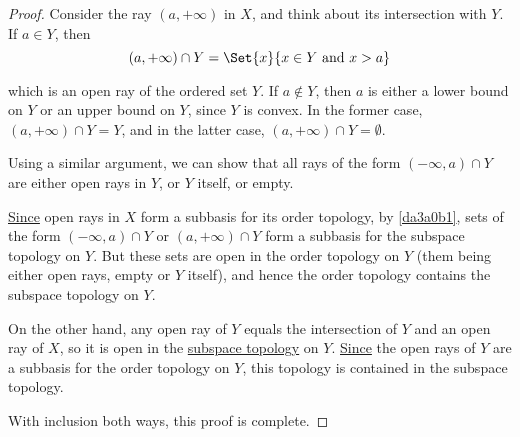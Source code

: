 \begin{proof}
  \def\T{\mathcal T}
  Consider the ray $(a,+\infty)$ in $X$, and think about its intersection with
  $Y$. If $a\in Y$, then
  $$
    (a,+\infty)\cap Y=\Set{x}{x\in Y\text{ and }x>a}
  $$

  which is an open ray of the ordered set $Y$. If $a\notin Y$, then $a$ is
  either a lower bound on $Y$ or an upper bound on $Y$, since $Y$ is convex. In
  the former case, $(a,+\infty)\cap Y=Y$, and in the latter case,
  $(a,+\infty)\cap Y=\emptyset$.

  Using a similar argument, we can show that all rays of the form
  $(-\infty,a)\cap Y$ are either open rays in $Y$, or $Y$ itself, or empty.

  \href{bc48b15}{Since} open rays in $X$ form a subbasis for its order topology,
  by \autoref{da3a0b1}, sets of the form $(-\infty,a)\cap Y$ or $(a,+\infty)\cap
  Y$ form a subbasis for the subspace topology on $Y$. But these sets are open
  in the order topology on $Y$ (them being either open rays, empty or $Y$
  itself), and hence the order topology contains the subspace topology on $Y$.

  On the other hand, any open ray of $Y$ equals the intersection of $Y$ and an
  open ray of $X$, so it is open in the \href{cddfbd8}{subspace topology} on
  $Y$. \href{bc48b15}{Since} the open rays of $Y$ are a subbasis for the order
  topology on $Y$, this topology is contained in the subspace topology.

  With inclusion both ways, this proof is complete.
\end{proof}
